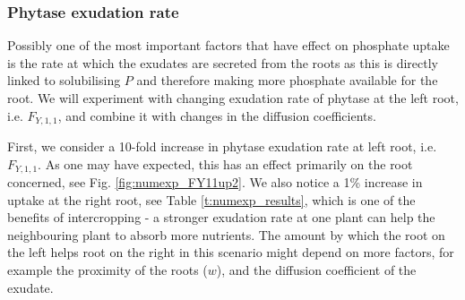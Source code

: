 \documentclass[11pt]{article}
\numberwithin{equation}{section}
\begin{document}
\subsubsection{Phytase exudation rate}
\label{sec:numexp_F11}

Possibly one of the most important factors that have effect on phosphate uptake is the rate at which the exudates are secreted from the roots as this is directly linked to solubilising $P$ and therefore making more phosphate available for the root. We will experiment with changing exudation rate of phytase at the left root, i.e. $F_{Y,1,1}$, and combine it with changes in the diffusion coefficients.

First, we consider a 10-fold increase in phytase exudation rate at left root, i.e. $F_{Y,1,1}$. As one may have expected, this has an effect primarily on the root concerned, see Fig. \ref{fig:numexp_FY11up2}. We also notice a 1\% increase in uptake at the right root, see Table \ref{t:numexp_results}, which is one of the benefits of intercropping - a stronger exudation rate at one plant can help the neighbouring plant to absorb more nutrients. The amount by which the root on the left helps root on the right in this scenario might depend on more factors, for example the proximity of the roots ($w$), and the diffusion coefficient of the exudate. 
\end{document}
